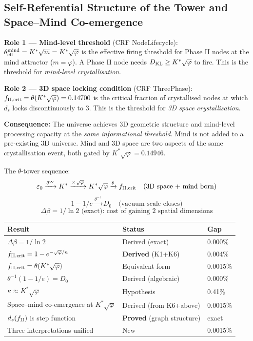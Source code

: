 \documentclass[12pt, a4paper]{article}
\begin{document}
\subsection{Self-Referential Structure of the Tower and Space--Mind Co-emergence}

\begin{derivedbox}[title={$K^*\sqrt{\varphi}$ Plays a Dual Role: Mind-Level Threshold AND 3D Locking}]
\textbf{Role 1 --- Mind-level threshold} (CRF NodeLifecycle): $\theta_{\rm eff}^{\rm mind} = K^*\sqrt{m} = K^*\sqrt{\varphi}$ is the effective firing threshold for Phase II nodes at the mind attractor ($m=\varphi$). A Phase II node needs $D_{\rm KL}\geq K^*\sqrt{\varphi}$ to fire. This is the threshold for \emph{mind-level crystallisation}.

\textbf{Role 2 --- 3D space locking condition} (CRF ThreePhase): $f_{\rm II,crit} = \theta(K^*\sqrt{\varphi}) = 0.14700$ is the critical fraction of crystallised nodes at which $d_s$ locks discontinuously to 3. This is the threshold for \emph{3D space crystallisation}.

\textbf{Consequence:} The universe achieves 3D geometric structure and mind-level processing capacity at the \emph{same informational threshold}. Mind is not added to a pre-existing 3D universe. Mind and 3D space are two aspects of the same crystallisation event, both gated by $K^*\sqrt{\varphi} = 0.14946$.

The $\theta$-tower sequence:
\[
  \varepsilon_0 \xrightarrow{\theta^\infty} K^*
  \xrightarrow{\times\sqrt{\varphi}} K^*\sqrt{\varphi}
  \xrightarrow{\theta} f_{\rm II,crit} \quad \text{(3D space + mind born)}
\]
\[
  1-1/e \xrightarrow{\theta^{-1}} D_0 \quad \text{(vacuum scale closes)}
\]
\[
  \Delta\beta = 1/\ln 2 \text{ (exact): cost of gaining 2 spatial dimensions}
\]
\end{derivedbox}

\begin{center}
\renewcommand{\arraystretch}{1.3}
\begin{tabular}{p{5.5cm} p{2.8cm} p{1.8cm}}
\toprule
\textbf{Result} & \textbf{Status} & \textbf{Gap} \\
\midrule
$\Delta\beta = 1/\ln 2$ & Derived (exact) & 0.000\% \\
$f_{\rm II,crit} = 1-e^{-\sqrt{\varphi}/n}$ & \textbf{Derived} (K1+K6) & 0.004\% \\
$f_{\rm II,crit} = \theta(K^*\sqrt{\varphi})$ & Equivalent form & 0.0015\% \\
$\theta^{-1}(1-1/e) = D_0$ & Derived (algebraic) & 0.000\% \\
$\kappa \approx K^*\sqrt{\varphi}$ & Hypothesis & 0.41\% \\
Space--mind co-emergence at $K^*\sqrt{\varphi}$ & Derived (from K6+above) & 0.0015\% \\
$d_s(f_{\rm II})$ is step function & \textbf{Proved} (graph structure) & exact \\
Three interpretations unified & New & 0.0015\% \\
\bottomrule
\end{tabular}
\end{center}
\end{document}
